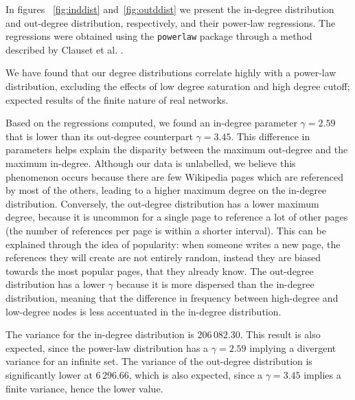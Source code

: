\documentclass[9pt,a4paper,twocolumn,notitlepage]{article}
\begin{document}
In figures ~\ref{fig:inddist} and~\ref{fig:outddist} we present the in-degree distribution and out-degree distribution, respectively, and their power-law regressions. The regressions were obtained using the \texttt{powerlaw} package \cite{alstott_bullmore_plenz_2014} through a method described by Clauset et al. \cite{Clauset2009}.

We have found that our degree distributions correlate highly with a power-law distribution, excluding the effects of low degree saturation and high degree cutoff; expected results of the finite nature of real networks.

Based on the regressions computed, we found an in-degree parameter $\gamma = 2.59$ that is lower than its out-degree counterpart $\gamma = 3.45$. This difference in parameters helps explain the disparity between the maximum out-degree and the maximum in-degree. Although our data is unlabelled, we believe this phenomenon occurs because there are few Wikipedia pages which are referenced by most of the others, leading to a higher maximum degree on the in-degree distribution. Conversely, the out-degree distribution has a lower maximum degree, because it is uncommon for a single page to reference a lot of other pages (the number of references per page is within a shorter interval). This can be explained through the idea of popularity: when someone writes a new page, the references they will create are not entirely random, instead they are biased towards the most popular pages, that they already know.
The out-degree distribution has a lower $\gamma$ because it is more dispersed than the in-degree distribution, meaning that the difference in frequency between high-degree and low-degree nodes is less accentuated in the in-degree distribution.

The variance for the in-degree distribution is $206\,082.30$. This result is also expected, since the power-law distribution has a $\gamma = 2.59$ implying a divergent variance for an infinite set. The variance of the out-degree distribution is significantly lower at $6\,296.66$, which is also expected, since a $\gamma = 3.45$ implies a finite variance, hence the lower value.
\end{document}
